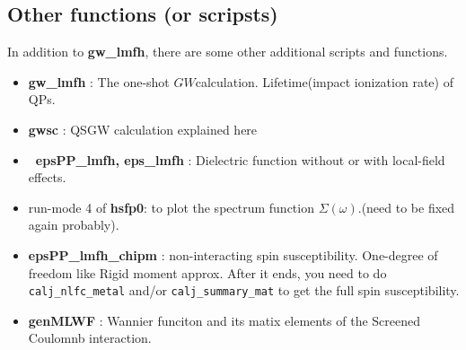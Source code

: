 \documentclass[a4paper,10pt,epsf,fleqn]{article}
\newcommand{\GW}{$GW$}
\begin{document}
{%


\vspace{3mm}
\subsection{\bf Other functions (or scripsts)}
In addition to {\bf gw\_lmfh}, there are some other additional scripts 
and functions.

\begin{itemize}
\item
{\bf gw\_lmfh} : The one-shot \GW calculation. 
     Lifetime(impact ionization rate) of QPs.

\item
{\bf gwsc} : QSGW calculation explained here

\item
{\bf \ epsPP\_lmfh, eps\_lmfh} : Dielectric function without or with local-field effects.

\item
 run-mode 4 of {\bf hsfp0}: to plot the spectrum function
     $\Sigma(\omega)$.(need to be fixed again probably). 


\item
{\bf epsPP\_lmfh\_chipm} : non-interacting spin susceptibility. 
One-degree of freedom like Rigid moment approx.
After it ends, you need to do \verb#calj_nlfc_metal# and/or \verb#calj_summary_mat#
to get the full spin susceptibility.

\item
{\bf genMLWF} : Wannier funciton and its matix elements of the Screened
     Coulomnb interaction.

\end{itemize}



}
\end{document}
